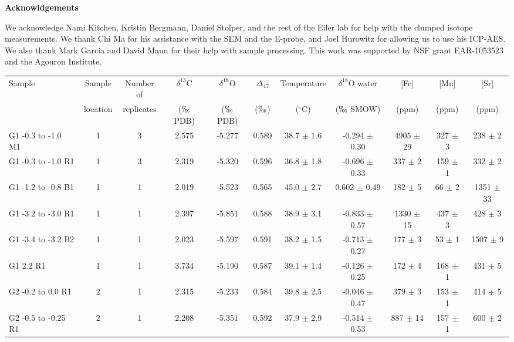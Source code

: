 \documentclass{article}
\newcommand{\deltao}{$\delta^{18}$}
\newcommand{\deltac}{$\delta^{13}$}
\newcommand{\degrees}{$^{\circ}$}
\begin{document}
\vspace{0.7cm} \noindent \large \textbf{Acknowldgements} \normalsize

We acknowledge Nami Kitchen, Kristin Bergmann, Daniel Stolper, and the rest of the Eiler lab for help with the clumped isotope measurements. We thank Chi Ma for his assistance with the SEM and the E-probe, and Joel Hurowitz for allowing us to use his ICP-AES. We also thank Mark Garcia and David Mann for their help with sample processing. This work was supported by NSF grant EAR-1053523 and the Agouron Institute. 

\newpage




\begin{sidewaystable}[htbp]
\centering
\small
\begin{tabular}{ | l | c | c | c | c | c | c | c | c | c | c | }
\multirow{2}{*}{Sample} & Sample & Number of & \deltac C & \deltao O & $\Delta_{47}$ & Temperature & \deltao O water & [Fe] & [Mn] & [Sr] \\
 & location & replicates & ($\permil$ PDB) & ($\permil$ PDB) & ($\permil$) & (\degrees C) & ($\permil$ SMOW) & (ppm) & (ppm) & (ppm)\\ \hline
G1 -0.3 to -1.0 M1 & 1 & 3 & 2.575 & -5.277 & 0.589 & 38.7 $\pm$ 1.6 & -0.294 $\pm$ 0.30 & 4905 $\pm$ 29 & 327 $\pm$ 3 & 238 $\pm$ 2 \\
G1 -0.3 to -1.0 R1 & 1 & 3 & 2.319 & -5.320 & 0.596 & 36.8 $\pm$ 1.8 & -0.696 $\pm$ 0.33 & 337 $\pm$ 2 & 159 $\pm$ 1 & 332 $\pm$ 2 \\
G1 -1.2 to -0.8 B1 & 1 & 1 & 2.019 & -5.523 & 0.565 & 45.0 $\pm$ 2.7 & 0.602 $\pm$ 0.49 & 182 $\pm$ 5 & 66 $\pm$ 2 & 1351 $\pm$ 33 \\
G1 -3.2 to -3.0 R1 & 1 & 1 & 2.397 & -5.851 & 0.588 & 38.9 $\pm$ 3.1 & -0.833 $\pm$ 0.57 & 1330 $\pm$ 15 & 437 $\pm$ 3 & 428 $\pm$ 3 \\
G1 -3.4 to -3.2 B2 & 1 & 1 & 2.023 & -5.597 & 0.591 & 38.2 $\pm$ 1.5 & -0.713 $\pm$ 0.27 & 177 $\pm$ 3 & 53 $\pm$ 1 & 1507 $\pm$ 9 \\
G1 2.2 R1 & 1 & 1 & 3.734 & -5.190 & 0.587 & 39.1 $\pm$ 1.4 & -0.126 $\pm$ 0.25 & 172 $\pm$ 4 & 168 $\pm$ 1 & 431 $\pm$ 5 \\
G2 -0.2 to 0.0 R1 & 2 & 1 & 2.315 & -5.233 & 0.584 & 39.8 $\pm$ 2.5 & -0.046 $\pm$ 0.47 & 379 $\pm$ 3 & 153 $\pm$ 1 & 414 $\pm$ 5 \\
G2 -0.5 to -0.25 R1 & 2 & 1 & 2.208 & -5.351 & 0.592 & 37.9 $\pm$ 2.9 & -0.514 $\pm$ 0.53 & 887 $\pm$ 14 & 157 $\pm$ 1 & 600 $\pm$ 2 \\

\end{tabular}
\end{sidewaystable}
\end{document}
